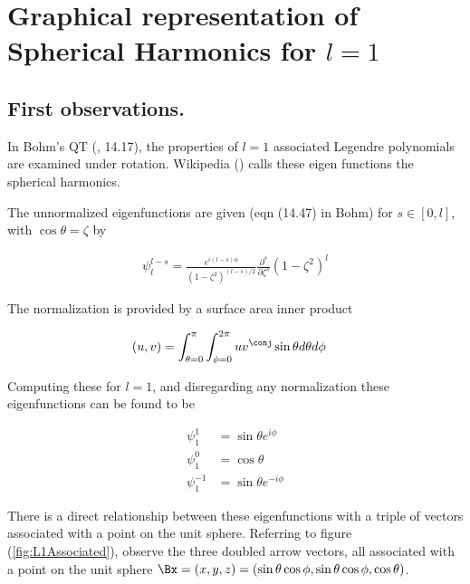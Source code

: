 

\chapter{Graphical representation of Spherical Harmonics for $l=1$}
\label{chap:L1Associated}
{}
\date{Aug 16, 2009}

\beginArtNoToc

\section{First observations.}

In Bohm's QT (\cite{bohm1989qt}, 14.17), the properties of $l=1$ associated Legendre polynomials are examined under rotation.  Wikipedia (\cite{wiki:sphericalHarm}) calls these eigen functions the spherical harmonics.

The unnormalized eigenfunctions are given (eqn (14.47) in Bohm) for $s \in [0,l]$, with $\cos\theta = \zeta$ by

\begin{align}\label{eqn:foo0}
\psi_l^{l-s} = \frac{e^{i(l-s)\phi}}{(1-\zeta^2)^{(l-s)/2}} \frac{\partial^s}{\partial \zeta^s} (1-\zeta^2)^l
\end{align}

The normalization is provided by a surface area inner product

\begin{align}\label{eqn:foo2}
(u,v) &= \int_{\theta=0}^{\pi} \int_{\phi=0}^{2\pi} u v^\conj \sin\theta d\theta d\phi
\end{align}

Computing these for $l=1$, and disregarding any normalization these eigenfunctions can be found to be

\begin{align}\label{eqn:foo1}
\psi_1^1 &= \sin\theta e^{i\phi} \\
\psi_1^0 &= \cos\theta \\
\psi_1^{-1} &= \sin\theta e^{-i\phi}
\end{align}

There is a direct relationship between these eigenfunctions with a triple of vectors associated with a point on the unit sphere.  Referring to figure (\ref{fig:L1Associated}), observe the three doubled arrow vectors, all associated with a point on the unit sphere $\Bx = (x,y,z) = (\sin\theta \cos\phi, \sin\theta \cos\phi, \cos\theta)$.  

